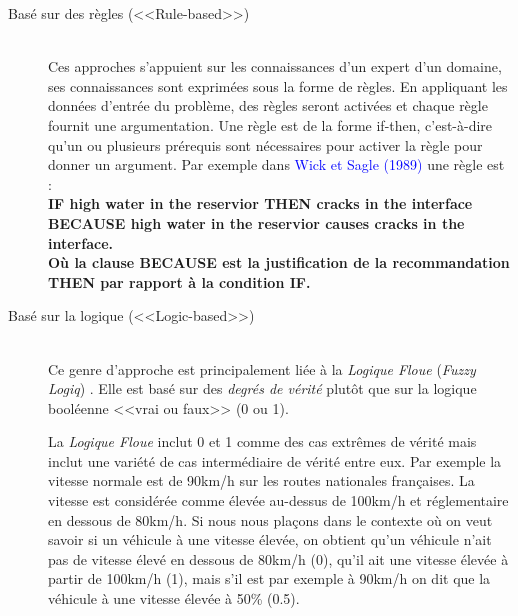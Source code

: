 \documentclass[a4paper, 11pt]{article}
\renewcommand{\textbf}[1]{\begingroup\bfseries\mathversion{bold}#1\endgroup}
\begin{document}
\begin{description}
	\item [Basé sur des règles (<<Rule-based>>)]  \hfill \\
    Ces approches s'appuient sur les connaissances d'un expert d'un domaine, ses connaissances sont exprimées sous la forme de règles. En appliquant les données d'entrée du problème, des règles seront activées et chaque règle fournit une argumentation. Une règle est de la forme if-then, c'est-à-dire qu'un ou plusieurs prérequis sont nécessaires pour activer la règle pour donner un argument. Par exemple dans \textcolor{blue}{Wick et  Sagle (1989)} une règle est : \\

    \textbf{IF} high water in the 	reservior\newline
 	\qquad \textbf{THEN} cracks in the interface\newline
	\hspace{1cm}\textbf{BECAUSE} high water in the reservior causes cracks in the interface.\\
    
Où la clause \textbf{BECAUSE} est la justification de la recommandation \textbf{THEN} par rapport à la condition \textbf{IF}.\\

	\item [Basé sur la logique (<<Logic-based>>)]  \hfill \\
		Ce genre d'approche est principalement liée à la \textit{Logique Floue} (\textit{Fuzzy Logiq}) \textcolor{blue}{\citep{Zadeh}}. Elle est basé sur des \textit{degrés de vérité} plutôt que sur la logique booléenne <<vrai ou faux>> (0 ou 1). 
        
La \textit{Logique Floue} inclut 0 et 1 comme des cas extrêmes de vérité mais inclut une variété de cas intermédiaire de vérité entre eux. Par exemple la vitesse normale est de 90km/h sur les routes nationales françaises. La vitesse est considérée comme élevée au-dessus de 100km/h et réglementaire en dessous de 80km/h. Si nous nous plaçons dans le contexte où on veut savoir si un véhicule à une vitesse élevée, on obtient qu'un véhicule n'ait pas de vitesse élevé en dessous de 80km/h (0), qu'il ait une vitesse élevée à partir de 100km/h (1), mais s'il est par exemple à 90km/h
on dit que la véhicule à une vitesse élevée à 50\% (0.5).\\
       

\end{description}
\end{document}

